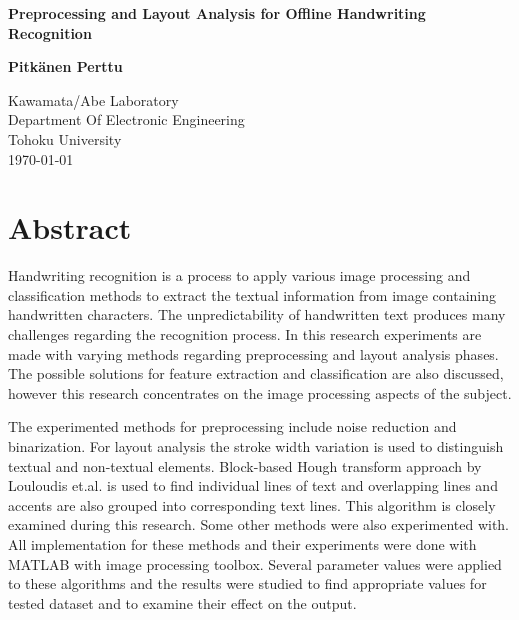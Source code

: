 \documentclass{article}
\begin{document}
   \begin{titlepage}
     \begin{center}
       \vspace*{1cm}

        \huge
        \textbf{Preprocessing and Layout Analysis for Offline Handwriting Recognition}

        \vspace{1cm}
        \LARGE
        \textbf{Pitk{\"a}nen Perttu}

        \vfill
        \Large
        Kawamata/Abe Laboratory\\
        Department Of Electronic Engineering\\
        Tohoku University\\
        \today
     \end{center}
   \end{titlepage}

   \newpage
   \section*{Abstract}
    Handwriting recognition is a process to apply various image processing and classification methods to extract the textual information from image containing handwritten characters. The unpredictability of handwritten text produces many challenges regarding the recognition process. In this research experiments are made with varying methods regarding preprocessing and layout analysis phases. The possible solutions for feature extraction and classification are also discussed, however this research concentrates on the image processing aspects of the subject.

    The experimented methods for preprocessing include noise reduction and binarization. For layout analysis the stroke width variation is used to distinguish textual and non-textual elements. Block-based Hough transform approach by Louloudis et.al. is used to find individual lines of text and overlapping lines and accents are also grouped into corresponding text lines. This algorithm is closely examined during this research. Some other methods were also experimented with. All implementation for these methods and their experiments were done with MATLAB with image processing toolbox. Several parameter values were applied to these algorithms and the results were studied to find appropriate values for tested dataset and to examine their effect on the output.
\end{document}
